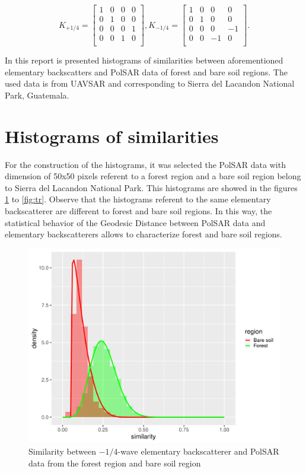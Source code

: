 \documentclass[conference]{IEEEtran}
\begin{document}
\[K_{+1/4}=
\begin{bmatrix}
1 & 0 & 0 & 0\\
0 & 1 & 0 & 0\\
0 & 0 & 0 & 1\\
0 & 0 & 1 & 0\\
\end{bmatrix},
K_{-1/4}=
\begin{bmatrix}
1 & 0 & 0 & 0\\
0 & 1 & 0 & 0\\
0 & 0 & 0 & -1\\
0 & 0 & -1 & 0\\
\end{bmatrix}
.\]

In this report is presented histograms of similarities between aforementioned elementary backscatters and PolSAR data of forest and bare soil regions. 
The used data is from UAVSAR and corresponding to Sierra  del  Lacandon  National  Park,  Guatemala. 

\section{Histograms of similarities}

For the construction of the histograms, it was selected the PolSAR data with dimension of 50x50 pixels referent to a forest region and a bare soil region belong to Sierra  del  Lacandon  National  Park. This histograms are showed in the figures \ref{fig:wvn} to \ref{fig:tr}. Observe that the histograms referent to the same elementary backscatterer are different to forest and bare soil regions. In this way, the statistical behavior of the Geodesic Distance between PolSAR data and elementary backscatterers allows to characterize forest and bare soil regions.

\begin{figure}[!ht]
    \vspace{.151\linewidth}
    \centering
    \includegraphics[width = .9\linewidth, height = .7\linewidth]{../../../Figures/paper_19_05/wvn.pdf}
    \caption{Similarity between $-1/4$-wave elementary backscatterer and PolSAR data from the forest region and bare soil region }
    \label{fig:wvn}
\end{figure}
\end{document}
